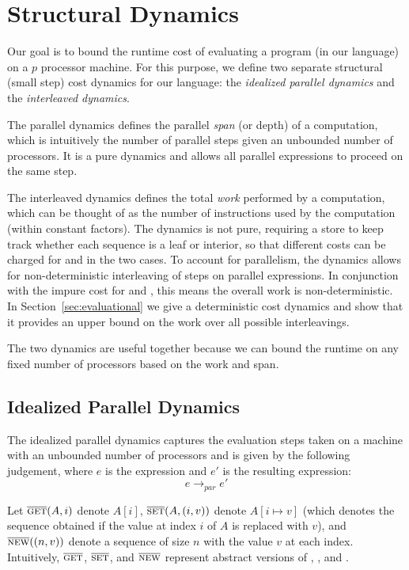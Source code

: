 \section{Structural Dynamics}
\label{sec:structural}

Our goal is to bound the runtime cost of evaluating a program (in our language) on a $p$ processor machine. For this purpose, we define two separate structural (small step) cost dynamics for our language: the \emph{idealized parallel dynamics} and the \emph{interleaved dynamics}.

The parallel dynamics defines the parallel \emph{span} (or depth) of a
computation, which is intuitively the number of parallel steps
given an unbounded number of processors. It is a pure dynamics
and allows all parallel expressions to proceed on the same step.

The interleaved dynamics defines the total \emph{work} performed by a
computation, which can be thought of as the number of instructions
used by the computation (within constant factors). The dynamics is
not pure, requiring a store to keep track whether each sequence is a leaf or interior, so that different costs can be charged for \get{} and \set{} in the two cases.  To account for parallelism, the dynamics allows for non-deterministic interleaving of steps on parallel expressions.  In conjunction with the impure cost for \get{} and \set{}, this means the overall work is non-deterministic. In Section~\ref{sec:evaluational} we give a deterministic cost dynamics and
show that it provides an upper bound on the work over all possible
interleavings.

The two dynamics are useful together because we can bound the
runtime on any fixed number of processors based on the work and span.

\subsection{Idealized Parallel Dynamics}

The idealized parallel dynamics captures the evaluation steps taken on a
machine with an unbounded number of processors and
is given by the following judgement, where $e$ is the expression and
$e'$ is the resulting expression:
$$e \to_{par} e'$$

Let $\overline{\text{{\sc get}{}}}(A, i)$ denote $A[i]$, $\overline{\text{{\sc set}{}}}(A, (i,v))$ denote $A[i \mapsto v]$ (which denotes the sequence obtained if the value at index $i$ of $A$ is replaced with $v$), and $\overline{\text{{\sc new}{}}}((n,v))$ denote a sequence of size $n$ with the value $v$ at each index. Intuitively, $\overline{\text{{\sc get}{}}}$, $\overline{\text{{\sc set}{}}}$, and $\overline{\text{{\sc new}{}}}$ represent abstract versions of \get{}, \set{}, and \new{}.

